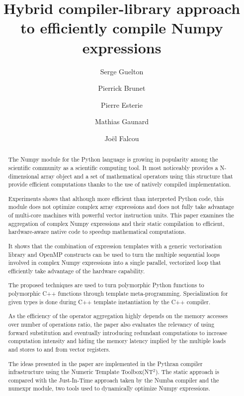 \documentclass{llncs}
\begin{document}
\title{Hybrid compiler-library approach to efficiently compile Numpy expressions}

\author{Serge Guelton \and Pierrick Brunet \and Pierre Esterie\\
 \and Mathias Gaunard \and Joël Falcou }

\maketitle

\begin{abstract}

    The Numpy module for the Python language is growing in popularity among the
    scientific community as a scientific computing tool. It most noticeably
    provides a N-dimensional array object and a set of mathematical operators
    using this structure that provide efficient computations thanks to the use
    of natively compiled implementation.

    Experiments shows that although more efficient than interpreted Python code,
    this module does not optimize complex array expressions and does not fully
    take advantage of multi-core machines with powerful vector instruction
    units. This paper examines the aggregation of complex Numpy expressions and
    their static compilation to efficient, hardware-aware native code to
    speedup mathematical computations.

    It shows that the combination of expression templates with a generic
    vectorisation library and OpenMP constructs can be used to turn the
    multiple sequential loops involved in complex Numpy expressions into a
    single parallel, vectorized loop that efficiently take advantage of the
    hardware capability.
    
    The proposed techniques are used to turn polymorphic Python functions to
    polymorphic C++ functions through template meta-programming. Specialization
    for given types is done during C++ template instantiation by the C++
    compiler.
    
    As the efficiency of the operator aggregation highly depends on the memory
    accesses over number of operations ratio, the paper also evaluates the
    relevancy of using forward substitution and eventually introducing
    redundant computations to increase computation intensity and hiding the
    memory latency implied by the multiple loads and stores to and from vector
    registers.

    The ideas presented in the paper are implemented in the Pythran compiler
    infrastructure using the Numeric Template Toolbox(NT$^2$). The static
    approach is compared with the Just-In-Time approach taken by the Numba
    compiler and the numexpr module, two tools used to dynamically optimize
    Numpy expressions. 

\end{abstract}

%
%
\end{document}
